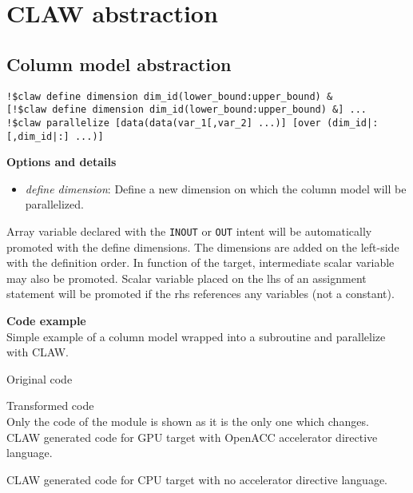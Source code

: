 \section{CLAW abstraction}


\subsection{Column model abstraction}

\begin{lstlisting}
!$claw define dimension dim_id(lower_bound:upper_bound) &
[!$claw define dimension dim_id(lower_bound:upper_bound) &] ...
!$claw parallelize [data(data(var_1[,var_2] ...)] [over (dim_id|:[,dim_id|:] ...)]
\end{lstlisting}

\textbf{Options and details}
\begin{itemize}
\item \textit{define dimension}: Define a new dimension on which the column
model will be parallelized.
\end{itemize}

Array variable declared with the \lstinline!INOUT! or \lstinline!OUT! intent
will be automatically promoted with the define dimensions. The dimensions are
added on the left-side with the definition order.
In function of the target, intermediate scalar variable may also be promoted.
Scalar variable placed on the lhs of an assignment statement will be promoted
if the rhs references any variables (not a constant). 

\textbf{Code example}\\
\label{parallelize1}
Simple example of a column model wrapped into a subroutine and parallelize with
CLAW.

Original code



Transformed code\\
Only the code of the module is shown as it is the only one which changes.\\

CLAW generated code for GPU target with OpenACC accelerator directive language.


CLAW generated code for CPU target with no accelerator directive language.


